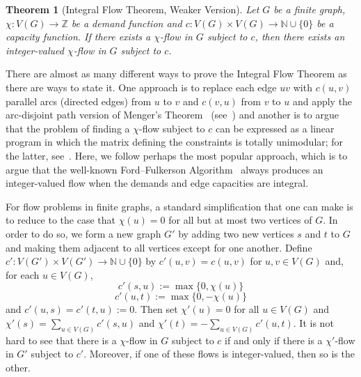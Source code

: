 \documentclass[12pt,a4paper]{amsart}
\numberwithin{equation}{section}
\newtheorem{theorem}[equation]{Theorem}
\theoremstyle{definition}
\begin{document}
\begin{theorem}[Integral Flow Theorem, Weaker Version]
\label{th:IFT2}
Let $G$ be a finite graph, $\chi:V(G)\to \mathbb{Z}$ be a demand function and $c:V(G)\times V(G)\to \mathbb{N}\cup\{0\}$ be a capacity function. If there exists a $\chi$-flow in $G$ subject to $c$, then there exists an integer-valued $\chi$-flow in $G$ subject to $c$.
\end{theorem}

There are almost as many different ways to prove the Integral Flow Theorem as there are ways to state it. One approach is to replace each edge $uv$ with $c(u,v)$ parallel arcs (directed edges) from $u$ to $v$ and $c(v,u)$ from $v$ to $u$ and apply the arc-disjoint path version of Menger's Theorem~\cite{Menger27} (see~\cite[Corollary~9.1b]{Schrijver03}) and another is to argue that the problem of finding a $\chi$-flow subject to $c$ can be expressed as a linear program in which the matrix defining the constraints is totally unimodular; for the latter, see~\cite[Corollary~13.9a]{Schrijver03}. Here, we follow perhaps the most popular approach, which is to argue that the well-known Ford--Fulkerson Algorithm~\cite{FordFulkerson57} always produces an integer-valued flow when the demands and edge capacities are integral.

For flow problems in finite graphs, a standard simplification that one can make is to reduce to the case that $\chi(u)=0$ for all but at most two vertices of $G$. In order to do so, we form a new graph $G'$ by adding two new vertices $s$ and $t$ to $G$ and making them adjacent to all vertices except for one another. Define $c':V(G')\times V(G')\to\mathbb{N}\cup\{0\}$ by $c'(u,v)=c(u,v)$ for $u,v\in V(G)$ and, for each $u\in V(G)$,
\[c'(s,u):=\max\{0,\chi(u)\}\]
\[c'(u,t):=\max\{0,-\chi(u)\}\]
and $c'(u,s)=c'(t,u):=0$. Then set $\chi'(u)=0$ for all $u\in V(G)$ and $\chi'(s)=\sum_{u\in V(G)}c'(s,u)$ and $\chi'(t)=-\sum_{u\in V(G)}c'(u,t)$. It is not hard to see that there is a  $\chi$-flow in $G$ subject to $c$ if and only if there is a $\chi'$-flow in $G'$ subject to $c'$. Moreover, if one of these flows is integer-valued, then so is the other. 
\end{document}
